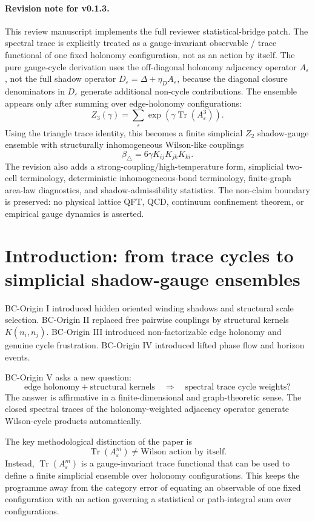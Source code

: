 \documentclass[11pt]{article}
\begin{document}
\paragraph{Revision note for v0.1.3.}
This review manuscript implements the full reviewer statistical-bridge patch. The spectral trace is explicitly treated as a gauge-invariant observable / trace functional of one fixed holonomy configuration, not as an action by itself. The pure gauge-cycle derivation uses the off-diagonal holonomy adjacency operator $A_\varepsilon$, not the full shadow operator $D_\varepsilon=\Delta+\eta_DA_\varepsilon$, because the diagonal closure denominators in $D_\varepsilon$ generate additional non-cycle contributions. The ensemble appears only after summing over edge-holonomy configurations:
\[
Z_3(\gamma)=\sum_\varepsilon \exp\left(\gamma\operatorname{Tr}(A_\varepsilon^3)\right).
\]
Using the triangle trace identity, this becomes a finite simplicial $Z_2$ shadow-gauge ensemble with structurally inhomogeneous Wilson-like couplings
\[
\beta_\triangle=6\gamma K_{ij}K_{jk}K_{ki}.
\]
The revision also adds a strong-coupling/high-temperature form, simplicial two-cell terminology, deterministic inhomogeneous-bond terminology, finite-graph area-law diagnostics, and shadow-admissibility statistics. The non-claim boundary is preserved: no physical lattice QFT, QCD, continuum confinement theorem, or empirical gauge dynamics is asserted.


\tableofcontents

\section{Introduction: from trace cycles to simplicial shadow-gauge ensembles}

BC-Origin I introduced hidden oriented winding shadows and structural scale selection. BC-Origin II replaced free pairwise couplings by structural kernels $K(n_i,n_j)$. BC-Origin III introduced non-factorizable edge holonomy and genuine cycle frustration. BC-Origin IV introduced lifted phase flow and horizon events.

BC-Origin V asks a new question:
\[
\text{edge holonomy}+\text{structural kernels}\quad\Longrightarrow\quad\text{spectral trace cycle weights?}
\]
The answer is affirmative in a finite-dimensional and graph-theoretic sense. The closed spectral traces of the holonomy-weighted adjacency operator generate Wilson-cycle products automatically.

The key methodological distinction of the paper is
\[
\operatorname{Tr}(A_\varepsilon^m)\neq\text{Wilson action by itself}.
\]
Instead, $\operatorname{Tr}(A_\varepsilon^m)$ is a gauge-invariant trace functional that can be used to define a finite simplicial ensemble over holonomy configurations. This keeps the programme away from the category error of equating an observable of one fixed configuration with an action governing a statistical or path-integral sum over configurations.
\end{document}

